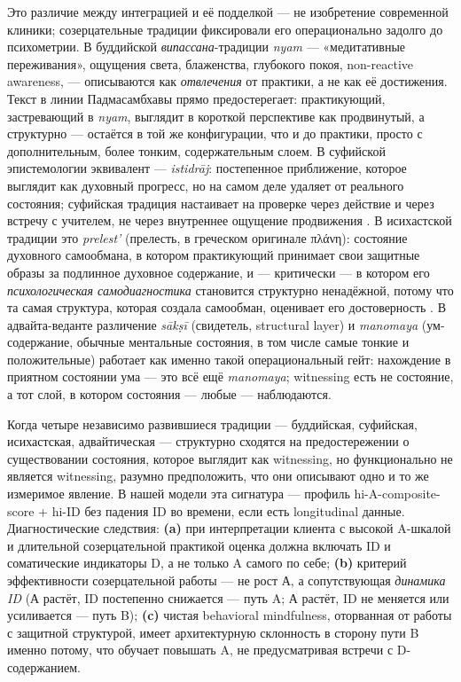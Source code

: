 Это различие между интеграцией и её подделкой --- не изобретение современной клиники; созерцательные традиции фиксировали его операционально задолго до психометрии. В буддийской \emph{випассана}-традиции \textit{nyam} --- «медитативные переживания», ощущения света, блаженства, глубокого покоя, non-reactive awareness, --- описываются как \emph{отвлечения} от практики, а не как её достижения. Текст \citet[XIV в.][]{kamalashila1996} в линии Падмасамбхавы прямо предостерегает: практикующий, застревающий в \textit{nyam}, выглядит в короткой перспективе как продвинутый, а структурно --- остаётся в той же конфигурации, что и до практики, просто с дополнительным, более тонким, содержательным слоем. В суфийской эпистемологии эквивалент --- \textit{istidrāj}: постепенное приближение, которое выглядит как духовный прогресс, но на самом деле удаляет от реального состояния; суфийская традиция настаивает на проверке через действие и через встречу с учителем, не через внутреннее ощущение продвижения \citep{schimmel1975}. В исихастской традиции это \textit{prelest'} (прелесть, в греческом оригинале \textgreek{πλάνη}): состояние духовного самообмана, в котором практикующий принимает свои защитные образы за подлинное духовное содержание, и --- критически --- в котором его \emph{психологическая самодиагностика} становится структурно ненадёжной, потому что та самая структура, которая создала самообман, оценивает его достоверность \citep{florovsky1987}. В адвайта-веданте различение \textit{sākṣī} (свидетель, structural layer) и \textit{manomaya} (ум-содержание, обычные ментальные состояния, в том числе самые тонкие и положительные) работает как именно такой операциональный гейт: нахождение в приятном состоянии ума --- это всё ещё \textit{manomaya}; witnessing есть не состояние, а тот слой, в котором состояния --- любые --- наблюдаются.

Когда четыре независимо развившиеся традиции --- буддийская, суфийская, исихастская, адвайтическая --- структурно сходятся на предостережении о существовании состояния, которое выглядит как witnessing, но функционально не является witnessing, разумно предположить, что они описывают одно и то же измеримое явление. В нашей модели эта сигнатура --- профиль hi-A-composite-score + hi-ID без падения ID во времени, если есть longitudinal данные. Диагностические следствия: \textbf{(a)} при интерпретации клиента с высокой A-шкалой и длительной созерцательной практикой оценка должна включать ID и соматические индикаторы D, а не только A самого по себе; \textbf{(b)} критерий эффективности созерцательной работы --- не рост А, а сопутствующая \emph{динамика ID} (А растёт, ID постепенно снижается --- путь A; А растёт, ID не меняется или усиливается --- путь B); \textbf{(c)} чистая behavioral mindfulness, оторванная от работы с защитной структурой, имеет архитектурную склонность в сторону пути B именно потому, что обучает повышать A, не предусматривая встречи с D-содержанием.

